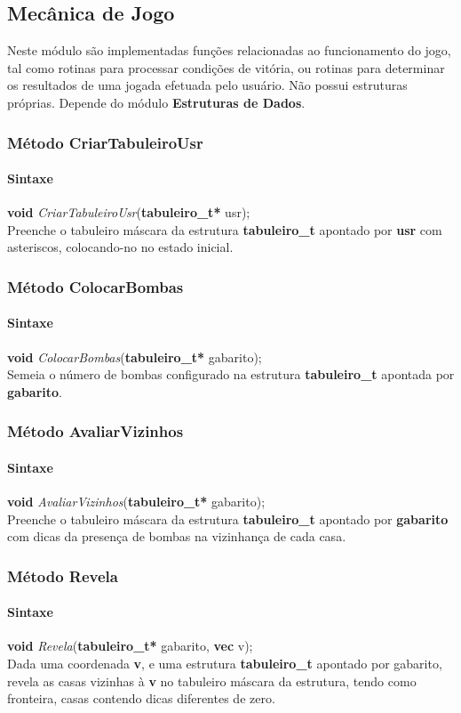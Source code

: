 \documentclass[10pt,a4paper]{report}
\begin{document}
\subsection{Mecânica de Jogo}
Neste módulo são implementadas funções relacionadas ao funcionamento do jogo, tal como rotinas para processar condições de vitória, ou rotinas para determinar os resultados de uma jogada efetuada pelo usuário. Não possui estruturas próprias. Depende do módulo \textbf{Estruturas de Dados}.
\subsubsection{Método CriarTabuleiroUsr}
\paragraph{Sintaxe}
\textbf{void} {\it CriarTabuleiroUsr}(\textbf{tabuleiro\_t*} usr);\\
Preenche o tabuleiro máscara da estrutura \textbf{tabuleiro\_t} apontado por \textbf{usr} com asteriscos, colocando-no no estado inicial.
\subsubsection{Método ColocarBombas}
\paragraph{Sintaxe}
\textbf{void} {\it ColocarBombas}(\textbf{tabuleiro\_t*} gabarito);\\
Semeia o número de bombas configurado na estrutura \textbf{tabuleiro\_t} apontada por \textbf{gabarito}.
\subsubsection{Método AvaliarVizinhos}
\paragraph{Sintaxe}
\textbf{void} {\it AvaliarVizinhos}(\textbf{tabuleiro\_t*} gabarito);\\
Preenche o tabuleiro máscara da estrutura \textbf{tabuleiro\_t} apontado por \textbf{gabarito} com dicas da presença de bombas na vizinhança de cada casa.
\subsubsection{Método Revela}
\paragraph{Sintaxe}
\textbf{void} {\it Revela}(\textbf{tabuleiro\_t*} gabarito, \textbf{vec} v);\\
Dada uma coordenada \textbf{v}, e uma estrutura \textbf{tabuleiro\_t} apontado por gabarito, revela as casas vizinhas à \textbf{v} no tabuleiro máscara da estrutura, tendo como fronteira, casas contendo dicas diferentes de zero.
\end{document}

